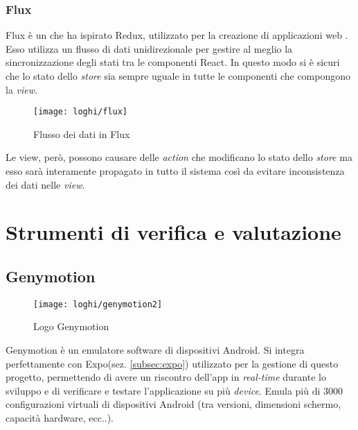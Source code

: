 \subsubsection{Flux} \label{subsubsec:flux}
 Flux è un  che ha ispirato Redux, utilizzato per la 
 creazione di applicazioni web . Esso utilizza un flusso di dati 
 unidirezionale per gestire al meglio la sincronizzazione degli stati tra le 
 componenti React. In questo modo si è sicuri che lo stato dello \emph{store} sia 
 sempre uguale in tutte le componenti che compongono la \emph{view}.
 
 \begin{figure}[H] 
 	\centering
 	\texttt{[image: loghi/flux]}
 	\caption{Flusso dei dati in Flux}
 \end{figure}
 Le view, però, possono causare delle \emph{action} che modificano lo stato dello \emph{store} 
 ma esso sarà interamente propagato in tutto il sistema così da evitare 
 inconsistenza dei dati nelle \emph{view}.
 
 
\section{Strumenti di verifica e valutazione}

\subsection{Genymotion} \label{subsez:genymotion}
\begin{figure}[H] 
	\centering
	\texttt{[image: loghi/genymotion2]}
	\caption{Logo Genymotion}
\end{figure}
Genymotion è un emulatore software di dispositivi Android. Si integra 
perfettamente con Expo(sez. \ref{subsec:expo}) utilizzato per la gestione di 
questo progetto, permettendo di avere un riscontro dell'app in \emph{real-time} durante 
lo sviluppo e di verificare e testare l'applicazione su più \emph{device}. Emula più 
di 3000 configurazioni virtuali di dispositivi Android (tra versioni, dimensioni 
schermo, capacità hardware, ecc..). 


